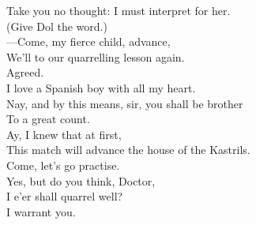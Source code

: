 \documentclass[a4paper,oneside,12pt]{memoir}
\begin{document}
\begin{drama*}
Take you no thought: I must interpret for her.\\
\subtlespeaks (Give Dol the word.)\\
 ---Come, my fierce child, advance,\\
We'll to our quarrelling lesson again.\\
\kastrilspeaks {} Agreed.\\
I love a Spanish boy with all my heart.\\
\subtlespeaks Nay, and by this means, sir, you shall be brother\\
To a great count.\\
\kastrilspeaks {} Ay, I knew that at first,\\
This match will advance the house of the Kastrils.\\
\subtlespeaks Come, let's go practise.\\
\kastrilspeaks {} Yes, but do you think, Doctor,\\
I e'er shall quarrel well?\\
\subtlespeaks {} I warrant you.\\
\scene


\end{drama*}
\end{document}
